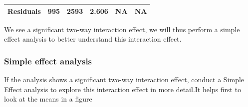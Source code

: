 \documentclass[]{article}
\newenvironment{Shaded}{\begin{snugshade}}{\end{snugshade}}
\newcommand{\KeywordTok}[1]{\textcolor[rgb]{0.13,0.29,0.53}{\textbf{#1}}}
\newcommand{\DataTypeTok}[1]{\textcolor[rgb]{0.13,0.29,0.53}{#1}}
\newcommand{\DecValTok}[1]{\textcolor[rgb]{0.00,0.00,0.81}{#1}}
\newcommand{\StringTok}[1]{\textcolor[rgb]{0.31,0.60,0.02}{#1}}
\newcommand{\CommentTok}[1]{\textcolor[rgb]{0.56,0.35,0.01}{\textit{#1}}}
\newcommand{\OperatorTok}[1]{\textcolor[rgb]{0.81,0.36,0.00}{\textbf{#1}}}
\newcommand{\NormalTok}[1]{#1}
\begin{document}
\begin{longtable}[]{@{}cccccc@{}}
\begin{minipage}[t]{0.24\columnwidth}
\textbf{Residuals}\strut
\end{minipage} & \begin{minipage}[t]{0.07\columnwidth}\centering\strut
995\strut
\end{minipage} & \begin{minipage}[t]{0.10\columnwidth}\centering\strut
2593\strut
\end{minipage} & \begin{minipage}[t]{0.12\columnwidth}\centering\strut
2.606\strut
\end{minipage} & \begin{minipage}[t]{0.12\columnwidth}\centering\strut
NA\strut
\end{minipage} & \begin{minipage}[t]{0.13\columnwidth}\centering\strut
NA\strut
\end{minipage}\tabularnewline
\bottomrule
\end{longtable}

We see a significant two-way interaction effect, we will thus perform a
simple effect analysis to better understand this interaction effect.

\subsubsection{Simple effect analysis}\label{simple-effect-analysis}

If the analysis shows a significant two-way interaction effect, conduct
a Simple Effect analysis to explore this interaction effect in more
detail.It helps first to look at the means in a figure

\begin{Shaded}
\end{Shaded}
\end{document}
